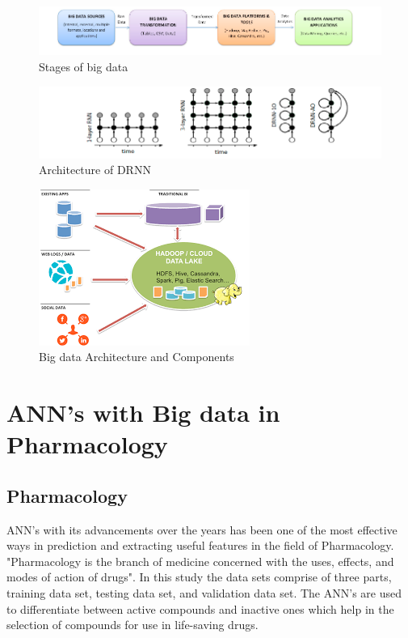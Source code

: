 \documentclass[sigconf]{acmart}
\begin{document}
\begin{figure}[htp]
    \includegraphics[width=1.0\columnwidth]{images/images1.jpg}
    \caption{Stages of big data}
    \label{fig:figure2}
\end{figure}

\begin{figure}[htp]
    \includegraphics[width=1.0\columnwidth]{images/images2.jpg}
    \caption{Architecture of DRNN}
    \label{fig:figure3}
\end{figure}

\begin{figure}[htp]
    \includegraphics[width=1.0\columnwidth]{images/images3.jpg}
    \caption{Big data Architecture and Components \cite{www-google}}
    \label{fig:figure4}
\end{figure}

\section{ANN's with Big data in Pharmacology}

\subsection{Pharmacology}
ANN's with its advancements over the years has been one of the most effective ways in prediction and extracting useful features in the field of Pharmacology. "Pharmacology is the branch of medicine concerned with the uses, effects, and modes of action of drugs"\cite{www-wiki}. In this study the data sets comprise of three parts, training data set, testing data set, and validation data set. The ANN's are used to differentiate between active compounds and inactive ones which help in the selection of compounds for use in life-saving drugs.\cite{LucasAntonPastur-Romay2016}
\end{document}
